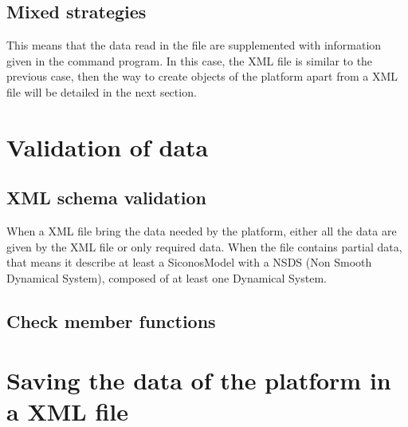 

\subsection{Mixed strategies}
This means that the data read in the file are supplemented with information given in the command
program.
In this case, the XML file is similar to the previous case, then the way to create objects of
the platform apart from a XML file will be detailed in the next section.

\clearpage
 \section{Validation of data}
\subsection{XML schema validation}
When a XML file bring the data needed by the platform, either all the data are given by the XML file or only required data. When the file contains partial data, that means it describe at least a SiconosModel with a NSDS (Non Smooth Dynamical System), composed of at least one Dynamical System.

\subsection{Check member functions}



\clearpage
\section{Saving the data of the platform in a XML file}



